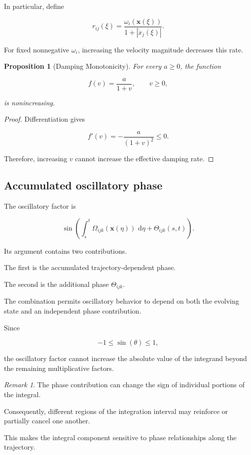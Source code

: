 \documentclass[12pt]{article}
\numberwithin{equation}{section}
\newcommand{\dd}{\,\mathrm{d}}
\newtheorem{proposition}[theorem]{Proposition}
\theoremstyle{definition}
\theoremstyle{remark}
\newtheorem{remark}[theorem]{Remark}
\begin{document}
In particular, define

\[
r_{ij}(\xi)
=
\frac{\omega_i(\mathbf{x}(\xi))}
{1+|\dot{x}_j(\xi)|}.
\]

For fixed nonnegative \(\omega_i\),
increasing the velocity magnitude
decreases this rate.

\begin{proposition}[Damping Monotonicity]

For every \(a\geq0\), the function

\[
f(v)=\frac{a}{1+v},
\qquad v\geq0,
\]

is nonincreasing.

\end{proposition}

\begin{proof}

Differentiation gives

\[
f'(v)
=
-\frac{a}{(1+v)^2}
\leq0.
\]

Therefore, increasing \(v\) cannot increase
the effective damping rate.

\end{proof}

\subsection{Accumulated oscillatory phase}

The oscillatory factor is

\[
\sin\left(
\int_s^t
\Omega_{ijk}(\mathbf{x}(\eta))
\,\dd\eta
+
\Theta_{ijk}(s,t)
\right).
\]

Its argument contains two contributions.

The first is the accumulated trajectory-dependent
phase.

The second is the additional phase
\(\Theta_{ijk}\).

The combination permits oscillatory behavior
to depend on both the evolving state and
an independent phase contribution.

Since

\[
-1\leq\sin(\theta)\leq1,
\]

the oscillatory factor cannot increase
the absolute value of the integrand beyond
the remaining multiplicative factors.

\begin{remark}

The phase contribution can change the sign
of individual portions of the integral.

Consequently, different regions of the
integration interval may reinforce or
partially cancel one another.

This makes the integral component sensitive
to phase relationships along the trajectory.

\end{remark}
\end{document}
